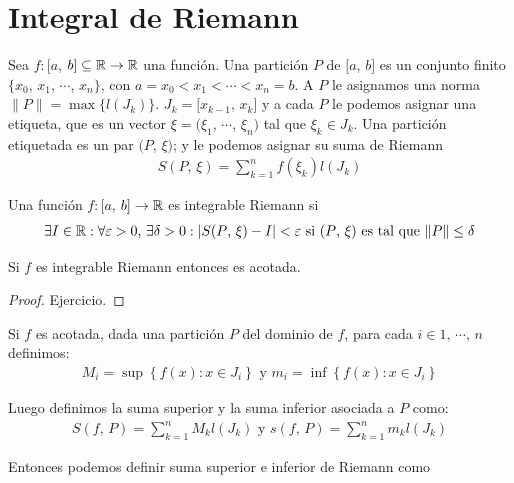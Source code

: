 \section{Integral de Riemann}

Sea \(f: [a\), \(b] \subseteq \mathbb{R} \to \mathbb{R}\) una función.
Una partición \(P\) de \([a\), \(b]\) es un conjunto finito \\ \(\{ x_0\), \(x_1\), \(\cdots\), \(x_n \}\), con
\(a = x_0 < x_1 < \cdots < x_n = b\). A \(P\) le asignamos una norma \(\| P \| = \max \{ l(J_k) \}\). \(J_k = [x_{k-1}\), \(x_k]\) y a cada \(P\) le
podemos asignar una etiqueta, que es un vector \(\xi = (\xi_1\), \(\cdots\), \(\xi_n)\) tal que \(\xi_k \in J_k\). Una partición etiquetada es un par
\((P\), \(\xi)\); y le podemos asignar su suma de Riemann \begin{align*}S(P\text{, } \xi) = \sum_{k=1}^{n} f(\xi_k) l(J_k)\end{align*}

\begin{definition}
    Una función \(f: [a\), \(b] \to \mathbb{R}\) es integrable Riemann si
    \begin{align*}
        \exists I \in \mathbb{R} : \forall \varepsilon > 0\text{, }\exists \delta > 0 : | S(P\text{, } \xi) - I | < \varepsilon \text{ si } (P\text{, } \xi) \text{ es tal que } \| P \| \leq \delta
    \end{align*}
\end{definition}

\begin{prop}
    Si \(f\) es integrable Riemann entonces es acotada.
    \begin{proof}
        Ejercicio.
    \end{proof}
\end{prop}

Si \(f\) es acotada, dada una partición \(P\) del dominio de \(f\), para cada \(i \in 1 \text{, } \cdots \text{, } n\) definimos:
\begin{align*}
    M_i = \sup \left\{ f(x) : x \in J_i \right\} \text{ y } m_i = \inf\left\{ f(x) : x \in J_i \right\}
\end{align*}

Luego definimos la suma superior y la suma inferior asociada a \(P\) como:
\begin{align*}
    S(f\text{, } P) = \sum_{k=1}^{n} M_k l(J_k) \text{ y } s(f\text{, } P) = \sum_{k=1}^{n} m_k l(J_k)
\end{align*}

Entonces podemos definir suma superior e inferior de Riemann como

